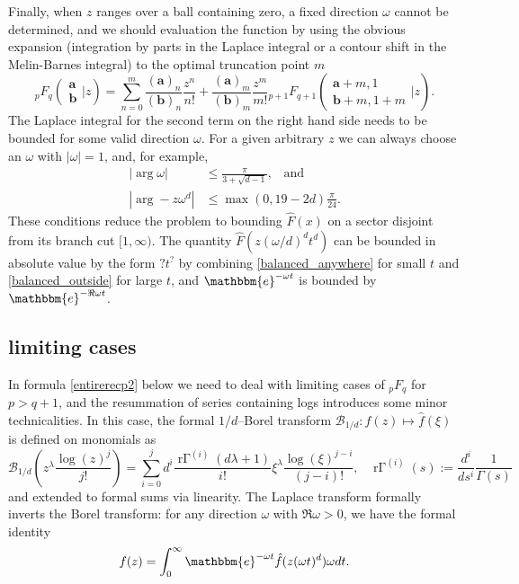 \documentclass[12pt]{article}
\newcommand{\ee}[0] {\mathbbm{e}}
\numberwithin{equation}{section}
\newcommand{\FF}[6] {{}_{#1}{#2}_{#3} \left( \begin{array}{c} #4 \\ #5 \end{array} \Big| {#6}  \right)}
\begin{document}
Finally, when $z$ ranges over a ball containing zero, a fixed direction $\omega$ cannot be determined, and we should evaluation the function by using the obvious expansion (integration by parts in the Laplace integral or a contour shift in the Melin-Barnes integral) to the optimal truncation point $m$
\begin{equation*}
\FF{p}{F}{q}{\mathbf{a}}{\mathbf{b}}{z} = \sum_{n=0}^{m} \frac{(\mathbf{a})_n}{(\mathbf{b})_n} \frac{z^n}{n!} + \frac{(\mathbf{a})_m}{(\mathbf{b})_m} \frac{z^m}{m!} \FF{p+1}{F}{q+1}{\mathbf{a}+m,1}{\mathbf{b}+m,1+m}{z}\text{.}
\end{equation*}
The Laplace integral for the second term on the right hand side needs to be bounded for some valid direction $\omega$. For a given arbitrary $z$ we can always choose an $\omega$ with $|\omega|=1$, and, for example,
\begin{align*}
|\arg \omega| &\le \frac{\pi}{3+\sqrt{d-1}}\text{,} \quad \text{and}\\
|\arg -z \omega^d| &\le \max(0, 19 - 2d)\frac{\pi}{24}\text{.}
\end{align*}
These conditions reduce the problem to bounding $\hat{F}(x)$ on a sector disjoint from its branch cut $[1, \infty)$. The quantity $\hat{F}(z (\omega/d)^d t^d)$ can be bounded in absolute value by the form $? t^?$ by combining \eqref{balanced_anywhere} for small $t$ and \eqref{balanced_outside} for large $t$, and $\ee^{-\omega t}$ is bounded by $\ee^{- \Re \omega t}$.

\subsection{limiting cases}
In formula \eqref{entirerecp2} below we need to deal with limiting cases of ${}_p F_q$ for $p > q+1$, and the resummation of series containing logs introduces some minor technicalities. In this case, the formal $1/d$--Borel transform $\mathcal{B}_{1/d}: f(z) \mapsto \hat{f}(\xi)$ is defined on monomials as
\begin{equation*}
\mathcal{B}_{1/d} \left(z^\lambda \frac{\log(z)^j}{j!} \right) = \sum_{i=0}^{j} d^{i}\frac{{\operatorname{r\Gamma}}^{(i)}(d\lambda+1)}{i!} {\xi}^{\lambda}\frac{\log(\xi)^{j-i}}{(j-i)!}\text{,} \quad \operatorname{r\Gamma}^{(i)}(s):=\frac{d^i}{ds^i}\frac{1}{\Gamma(s)}
\end{equation*}
and extended to formal sums via linearity. The Laplace transform formally inverts the Borel transform: for any direction $\omega$ with $\Re \omega > 0$, we have the formal identity
\begin{equation*}
f(z) = \int_{0}^{\infty} \ee^{-\omega t} \hat{f}(z (\omega t)^d) \omega dt\text{.}
\end{equation*}
\end{document}
